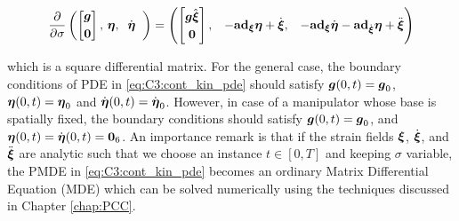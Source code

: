 %
%
\begin{equation}
\frac{\partial }{\partial \sigma} 
\begin{pmatrix}
\begin{bmatrix} {\boldsymbol{g}} \\[0.25em] \boldsymbol{0} 
\end{bmatrix},
\,{\boldsymbol{\eta}},\;
\;\dot{{\boldsymbol{\eta}}}\;\;
\end{pmatrix} = \begin{pmatrix}
\begin{bmatrix} {\boldsymbol{g}} \hat{{\boldsymbol{\xi}}} \\[0.25em] \boldsymbol{0} 
\end{bmatrix}
, & -\textbf{ad}_{\boldsymbol{\xi}}\boldsymbol{\eta} + \dot{\boldsymbol{\xi}}, & -\textbf{ad}_{\boldsymbol{\xi}}\dot{{\boldsymbol{\eta}}} -\textbf{ad}_{\dot{{\boldsymbol{\xi}}}}{\boldsymbol{\eta}}  + \ddot{\boldsymbol{\xi}}
\label{eq:C3:cont_kin_pde}
\end{pmatrix}
\end{equation}

\noindent which is a square differential matrix. For the general case, the boundary conditions of PDE in \eqref{eq:C3:cont_kin_pde} should satisfy ${\boldsymbol{g}}(0,t) = {\boldsymbol{g}}_0$, ${\boldsymbol{\eta}}(0,t) = {\boldsymbol{\eta}}_0$ and $\dot{{\boldsymbol{\eta}}}(0,t) = \dot{{\boldsymbol{\eta}}}_0$. However, in case of a manipulator whose base is spatially fixed, the boundary conditions should satisfy ${\boldsymbol{g}}(0,t) = {\boldsymbol{g}}_0$, and ${\boldsymbol{\eta}}(0,t) = \dot{{\boldsymbol{\eta}}}(0,t) = \boldsymbol{0}_6$. An importance remark is that if the strain fields ${\boldsymbol{\xi}}$, $\dot{{\boldsymbol{\xi}}}$, and $\ddot{{\boldsymbol{\xi}}}$ are analytic such that we choose an instance $t \in [0,T]$ and keeping $\sigma$ variable, the PMDE in \eqref{eq:C3:cont_kin_pde} becomes an ordinary Matrix Differential Equation (MDE) which can be solved numerically using the techniques discussed in Chapter \ref{chap:PCC}. 

